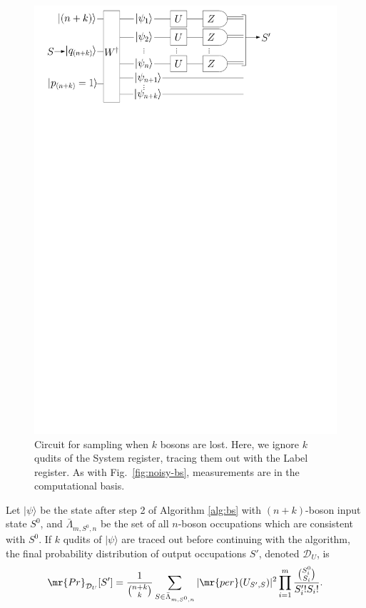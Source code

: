\begin{figure}
\includegraphics[width=\linewidth]{noisy_circuit/lost_circuit}
\caption[Circuit for sampling when $k$ bosons are lost]{Circuit for sampling when $k$ bosons are lost. 
Here, we ignore $k$ qudits of the System register, tracing them out with the Label register. 
As with Fig.~\ref{fig:noisy-bs}, measurements are in the computational basis.}
\label{fig:lost-bs}
\end{figure}

\begin{theorem}
Let $|\psi\rangle$ be the state after step 2 of Algorithm \ref{alg:bs} with $(n+k)$-boson input state $S^0$, and $\bar{\Lambda}_{m,S^0,n}$ be the set of all $n$-boson occupations which are consistent with $S^0$.
If $k$ qudits of $|\psi\rangle$ are traced out before continuing with the algorithm, the final probability distribution of output occupations $S'$, denoted $\mathcal{D}_U$, is
\begin{equation}
\mr{Pr}_{\mathcal{D}_U}[S'] = \frac{1}{\binom{n+k}{k}}\sum_{S \in \bar{\Lambda}_{m,S^0,n}} |\mr{per}(U_{S',S})|^2 \prod_{i=1}^m \frac{\binom{S_i^0}{S_i}}{S'_i! S_i!} .
\end{equation}
\end{theorem}

